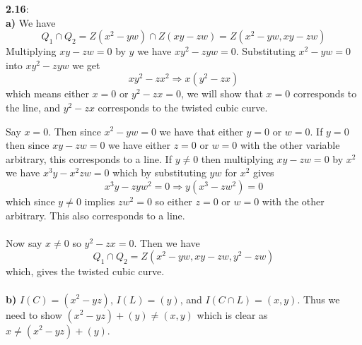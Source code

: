 \documentclass[12pt]{article}
\numberwithin{thm}{subsection}
\numberwithin{defn}{subsection}
\numberwithin{lemma}{subsection}
\numberwithin{example}{subsection}
\numberwithin{notation}{subsection}
\numberwithin{cor}{subsection}
\numberwithin{remark}{subsection}
\numberwithin{condition}{subsection}
\numberwithin{question}{subsection}
\numberwithin{construction}{subsection}
\numberwithin{construction}{subsection}
\numberwithin{construction}{subsection}
\begin{document}
%
\textbf{2.16}:\\
%
\textbf{a)} We have
\[Q_1 \cap Q_2 = Z(x^2 - yw) \cap Z(xy -zw) = Z(x^2 - yw, xy - zw)\]
Multiplying $xy - zw = 0$ by $y$ we have $xy^2 - zyw = 0$. Substituting $x^2 - yw = 0$ into $xy^2 - zyw$ we get
\[xy^2 - zx^2 \Longrightarrow x(y^2 - zx)\]
which means either $x = 0$ or $y^2 - zx = 0$, we will show that $x = 0$ corresponds to the line, and $y^2 - zx$ corresponds to the twisted cubic curve.

Say $x = 0$. Then since $x^2 - yw = 0$ we have that either $y = 0$ or $w = 0$. If $y = 0$ then since $xy - zw = 0$ we have either $z = 0$ or $w = 0$ with the other variable arbitrary, this corresponds to a line. If $y \neq 0$ then multiplying $xy - zw = 0$ by $x^2$ we have $x^3y - x^2zw = 0$ which by substituting $yw$ for $x^2$ gives
\[x^3y - zyw^2 = 0 \Longrightarrow y(x^3 - zw^2) = 0\]
which since $y \neq 0$ implies $zw^2 = 0$ so either $z = 0$ or $w = 0$ with the other arbitrary. This also corresponds to a line.\\\\
%
Now say $x \neq 0$ so $y^2 - zx = 0$. Then we have
\[Q_1 \cap Q_2 = Z(x^2 - yw, xy - zw, y^2 - zw)\]
which, gives the twisted cubic curve.\\\\
%
\textbf{b)} $I(C) = (x^2 - yz)$, $I(L) = (y)$, and $I(C \cap L) = (x,y)$. Thus we need to show $(x^2 - yz) + (y) \neq (x,y)$ which is clear as $x \neq (x^2 - yz) + (y)$.
\end{document}
